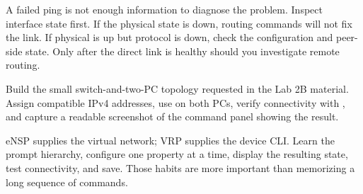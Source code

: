 \begin{pitfall}
A failed ping is not enough information to diagnose the problem. Inspect interface state first. If the physical state is down, routing commands will not fix the link. If physical is up but protocol is down, check the configuration and peer-side state. Only after the direct link is healthy should you investigate remote routing.
\end{pitfall}

\begin{tryit}
Build the small switch-and-two-PC topology requested in the Lab 2B material. Assign compatible IPv4 addresses, use  on both PCs, verify connectivity with , and capture a readable screenshot of the command panel showing the result.
\end{tryit}

\begin{chapterrecap}
eNSP supplies the virtual network; VRP supplies the device CLI. Learn the prompt hierarchy, configure one property at a time, display the resulting state, test connectivity, and save. Those habits are more important than memorizing a long sequence of commands.
\end{chapterrecap}

